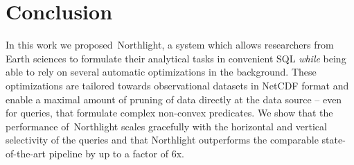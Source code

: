 \documentclass[conference]{IEEEtran}
\newcommand{\system}{Northlight}
\begin{document}
%
%



\vspace*{-0.3cm}
\section{Conclusion}
\vspace*{-0.2cm}
In this work we proposed~\system{}, a system which allows researchers from Earth sciences to formulate their analytical tasks in convenient SQL \textit{while} being able to rely on several automatic optimizations in the background. These optimizations are tailored towards observational datasets in NetCDF format and enable a maximal amount of pruning of data directly at the data source -- even for queries, that formulate complex non-convex predicates. We show that the performance of~\system{} scales gracefully with the horizontal and vertical selectivity of the queries and that \system{} outperforms the comparable state-of-the-art pipeline by up to a factor of 6x. 
\end{document}
